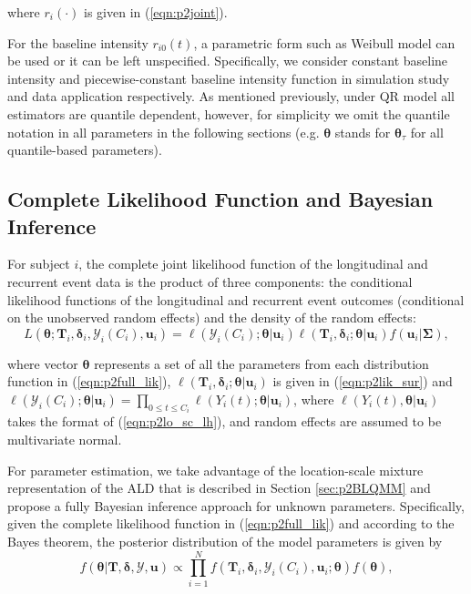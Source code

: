 \noindent where $r_i(\cdot)$ is given in (\ref{eqn:p2joint}).

For the baseline intensity $r_{i0}(t)$, a parametric form such as Weibull model can be used or it can be left unspecified. Specifically, we consider constant baseline intensity and piecewise-constant baseline intensity function in simulation study and data application respectively. As mentioned previously, under QR model all estimators are quantile dependent, however, for simplicity we omit the quantile notation in all parameters in the following sections (e.g. $\boldsymbol{\theta}$ stands for $\boldsymbol{\theta}_{\tau}$ for all quantile-based parameters).


\subsection{Complete Likelihood Function and Bayesian Inference}\label{sec:p2estimation}
For subject $i$, the complete joint likelihood function of the longitudinal and recurrent event data is the product of three components: the conditional likelihood functions of the longitudinal and recurrent event outcomes (conditional on the unobserved random effects) and the density of the random effects:
\begin{equation}\label{eqn:p2full_lik}
L(\boldsymbol{\theta};{\boldsymbol T}_i, \boldsymbol{\delta}_i, \mathcal{Y}_{i}(C_i), \boldsymbol{u}_i) = \ell(\mathcal{Y}_{i}(C_i); \boldsymbol{\theta}|\boldsymbol{u}_i)\ell({\boldsymbol T}_i, {\boldsymbol\delta}_i; \boldsymbol{\theta}|\boldsymbol{u}_i)f(\boldsymbol{u}_i|\boldsymbol{\Sigma}),
\end{equation}

\noindent where vector $\boldsymbol{\theta}$ represents a set of all the parameters from each distribution function in (\ref{eqn:p2full_lik}),  $\ell(\boldsymbol{T}_i, \boldsymbol{\delta}_i; \boldsymbol{\theta}|\boldsymbol{u}_i)$ is given in (\ref{eqn:p2lik_sur}) and $\ell(\mathcal{Y}_{i}(C_i); \boldsymbol{\theta}|\boldsymbol{u}_i)=\prod_{0\le t\le C_i}\ell(Y_{i}(t); \boldsymbol{\theta}|\boldsymbol{u}_i)$, where $\ell(Y_{i}(t), \boldsymbol{\theta}|\boldsymbol{u}_i)$ takes the format of (\ref{eqn:p2lo_sc_lh}), and random effects are assumed to be multivariate normal.

For parameter estimation, we take advantage of the location-scale mixture representation of the ALD that is described in Section \ref{sec:p2BLQMM} and propose a fully Bayesian inference approach for unknown parameters. Specifically, given the complete likelihood function in (\ref{eqn:p2full_lik}) and according to the Bayes theorem, the posterior distribution of the model parameters is given by
\begin{equation}\label{eqn:p2posterior}
f(\boldsymbol{\theta}|\boldsymbol{T}, \boldsymbol{\delta}, \bm{\mathcal{Y}}, \boldsymbol{u})\propto \prod_{i=1}^N f(\boldsymbol{T}_i, \boldsymbol{\delta}_i, \mathcal{Y}_{i}(C_i), \boldsymbol{u}_i;\boldsymbol{\theta}) f(\boldsymbol{\theta}),
\end{equation}

